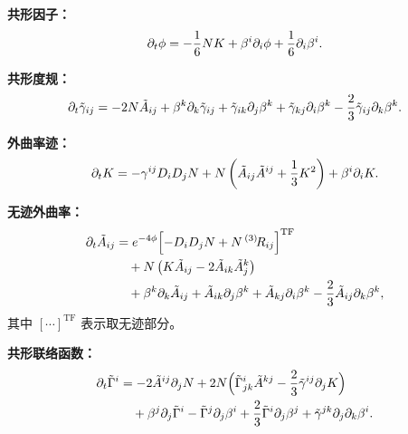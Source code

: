 \begin{theorem}
\textbf{共形因子：}
\begin{equation}
    \partial_t \phi = -\frac{1}{6}N K + \beta^i\partial_i\phi + \frac{1}{6}\partial_i\beta^i.
    \label{eq:BSSN_phi}
\end{equation}

\textbf{共形度规：}
\begin{equation}
    \partial_t \tilde{\gamma}_{ij} = -2N\tilde{A}_{ij} + \beta^k\partial_k\tilde{\gamma}_{ij} + \tilde{\gamma}_{ik}\partial_j\beta^k + \tilde{\gamma}_{kj}\partial_i\beta^k - \frac{2}{3}\tilde{\gamma}_{ij}\partial_k\beta^k.
    \label{eq:BSSN_gammatilde}
\end{equation}

\textbf{外曲率迹：}
\begin{equation}
    \partial_t K = -\gamma^{ij}D_i D_j N + N\left(\tilde{A}_{ij}\tilde{A}^{ij} + \frac{1}{3}K^2\right) + \beta^i\partial_i K.
    \label{eq:BSSN_K}
\end{equation}

\textbf{无迹外曲率：}
\begin{equation}
    \begin{aligned}
        \partial_t \tilde{A}_{ij} &= e^{-4\phi}\Bigl[-D_i D_j N + N\,{}^{(3)}\!R_{ij}\Bigr]^{\text{TF}} \\
        &\quad + N\left(K\tilde{A}_{ij} - 2\tilde{A}_{ik}\tilde{A}^k_j\right) \\
        &\quad + \beta^k\partial_k\tilde{A}_{ij} + \tilde{A}_{ik}\partial_j\beta^k + \tilde{A}_{kj}\partial_i\beta^k - \frac{2}{3}\tilde{A}_{ij}\partial_k\beta^k,
    \end{aligned}
    \label{eq:BSSN_Atilde}
\end{equation}
其中 $[\cdots]^{\text{TF}}$ 表示取无迹部分。

\textbf{共形联络函数：}
\begin{equation}
    \begin{aligned}
        \partial_t \tilde{\Gamma}^i &= -2\tilde{A}^{ij}\partial_j N + 2N\Bigl(\tilde{\Gamma}^i_{jk}\tilde{A}^{kj} - \frac{2}{3}\tilde{\gamma}^{ij}\partial_j K\Bigr) \\
        &\quad + \beta^j\partial_j\tilde{\Gamma}^i - \tilde{\Gamma}^j\partial_j\beta^i + \frac{2}{3}\tilde{\Gamma}^i\partial_j\beta^j + \tilde{\gamma}^{jk}\partial_j\partial_k\beta^i.
    \end{aligned}
    \label{eq:BSSN_Gamma}
\end{equation}
\label{thm:BSSN_system}
\end{theorem}

